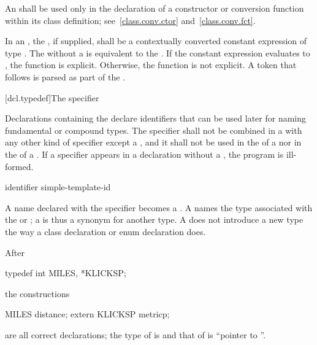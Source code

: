 \pnum
{}%
An  shall be used only in the declaration of
a constructor or conversion function within its class definition;
see~\ref{class.conv.ctor} and~\ref{class.conv.fct}.

\pnum
In an ,
the , if supplied, shall be a
contextually converted constant expression of type .
The  
without a  is equivalent to
the  .
If the constant expression evaluates to ,
the function is explicit. Otherwise, the function is not explicit.
A \tcode{(} token that follows  is parsed as
part of the .

[dcl.typedef]{The  specifier}%

\pnum
Declarations containing the  
declare identifiers that can be used later for naming
fundamental or compound
types. The  specifier shall not be
combined in a  with any other kind of
specifier except a , and it shall not be used in the
 of a
 nor in the
 of a
.
If a  specifier appears in a declaration without a ,
the program is ill-formed.

\begin{bnf}
\br
    identifier\br
    simple-template-id
\end{bnf}

A name declared with the  specifier becomes a
.
A  names
the type associated with the 
or ;
%
%
%
a  is thus a synonym for another type. A
 does not introduce a new type the way a class
declaration or enum declaration does.
\begin{example}
After

\begin{codeblock}
typedef int MILES, *KLICKSP;
\end{codeblock}

the constructions

\begin{codeblock}
MILES distance;
extern KLICKSP metricp;
\end{codeblock}

are all correct declarations; the type of  is
 and that of  is ``pointer to ''.
\end{example}

